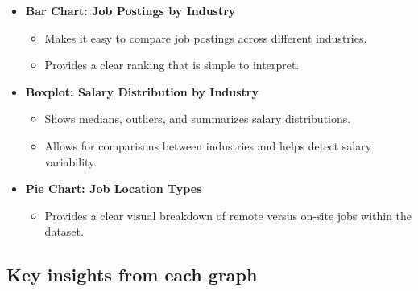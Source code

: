 \documentclass[
  letterpaper,
  DIV=11,
  numbers=noendperiod]{scrartcl}
\providecommand{\tightlist}{%
  \setlength{\itemsep}{0pt}\setlength{\parskip}{0pt}}
\begin{document}
\begin{itemize}
\tightlist
\item
  \textbf{Bar Chart: Job Postings by Industry}

  \begin{itemize}
  \tightlist
  \item
    Makes it easy to compare job postings across different industries.\\
  \item
    Provides a clear ranking that is simple to interpret.
  \end{itemize}
\item
  \textbf{Boxplot: Salary Distribution by Industry}

  \begin{itemize}
  \tightlist
  \item
    Shows medians, outliers, and summarizes salary distributions.\\
  \item
    Allows for comparisons between industries and helps detect salary
    variability.
  \end{itemize}
\item
  \textbf{Pie Chart: Job Location Types}

  \begin{itemize}
  \tightlist
  \item
    Provides a clear visual breakdown of remote versus on-site jobs
    within the dataset.
  \end{itemize}
\end{itemize}

\subsection{Key insights from each
graph}\label{key-insights-from-each-graph}
\end{document}
